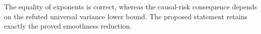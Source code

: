 The equality of exponents is correct, whereas the causal-risk consequence depends on the refuted universal variance lower bound.  The proposed statement retains exactly the proved smoothness reduction.